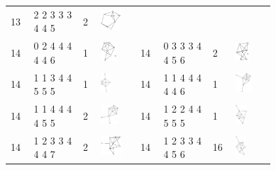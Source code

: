 \begin{footnotesize}
\begin{longtable}{
        m{0.05\linewidth} m{0.15\linewidth} m{0.05\linewidth} m{0.12\linewidth} |
        m{0.05\linewidth} m{0.15\linewidth} m{0.05\linewidth} m{0.12\linewidth}
    }
13 & 2 2 3 3 3 4 4 5 & 2 & \includegraphics[height=0.7151cm]{15-universal-graphs/img/degree-sequences-example-graphs/graph-4-8-61}\\
14 & 0 2 4 4 4 4 4 6 & 1 & \includegraphics[height=0.7151cm]{15-universal-graphs/img/degree-sequences-example-graphs/graph-4-8-62} &
14 & 0 3 3 3 4 4 5 6 & 2 & \includegraphics[height=0.7151cm]{15-universal-graphs/img/degree-sequences-example-graphs/graph-4-8-63}\\
14 & 1 1 3 4 4 5 5 5 & 1 & \includegraphics[height=0.7151cm]{15-universal-graphs/img/degree-sequences-example-graphs/graph-4-8-64} &
14 & 1 1 4 4 4 4 4 6 & 1 & \includegraphics[height=0.7151cm]{15-universal-graphs/img/degree-sequences-example-graphs/graph-4-8-65}\\
14 & 1 1 4 4 4 4 5 5 & 2 & \includegraphics[height=0.7151cm]{15-universal-graphs/img/degree-sequences-example-graphs/graph-4-8-66} &
14 & 1 2 2 4 4 5 5 5 & 1 & \includegraphics[height=0.7151cm]{15-universal-graphs/img/degree-sequences-example-graphs/graph-4-8-67}\\
14 & 1 2 3 3 4 4 4 7 & 2 & \includegraphics[height=0.7151cm]{15-universal-graphs/img/degree-sequences-example-graphs/graph-4-8-68} &
14 & 1 2 3 3 4 4 5 6 & 16 & \includegraphics[height=0.7151cm]{15-universal-graphs/img/degree-sequences-example-graphs/graph-4-8-69}\\

\end{longtable}
\end{footnotesize}

